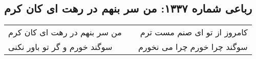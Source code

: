 \begin{center}
\section*{رباعی شماره ۱۳۳۷: من سر بنهم در رهت ای کان کرم}
\label{sec:1337}
\begin{longtable}{l p{0.5cm} r}
من سر بنهم در رهت ای کان کرم
&&
کامروز از تو ای صنم مست ترم
\\
سوگند خورم و گر تو باور نکنی
&&
سوگند چرا خورم چرا می نخورم
\\
\end{longtable}
\end{center}
